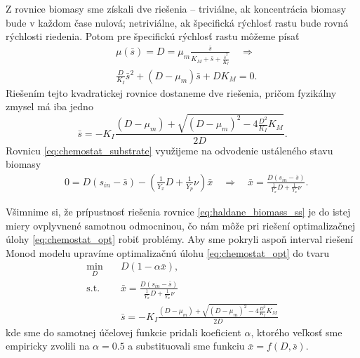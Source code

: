 Z rovnice biomasy sme získali dve riešenia -- triviálne, ak koncentrácia biomasy bude v každom čase nulová; netriviálne, ak špecifická rýchlosť rastu bude rovná rýchlosti riedenia. Potom pre špecifickú rýchlosť rastu môžeme písať 
\begin{align*}
	&\mu(\bar{s}) = D = \mu_{m}\frac{\bar{s}}{K_{M} + \bar{s} + \frac{\bar{s}^2}{K_{I}}} \quad \Longrightarrow \\
	&\frac{D}{K_{I}}\bar{s}^2 + (D-\mu_{m})\bar{s} + DK_{M} = 0.
\end{align*}
Riešením tejto kvadratickej rovnice dostaneme dve riešenia, pričom fyzikálny zmysel má iba jedno
\begin{equation}
	\bar{s} = -K_{I}\frac{\left(D-\mu_{m}\right) + \sqrt{\left(D-\mu_{m}\right)^2 - 4\frac{D^2}{K_{I}}K_{M}}}{2D}. \label{eq:haldane_subs_ss1}
\end{equation}
Rovnicu \eqref{eq:chemostat_substrate} využijeme na odvodenie ustáleného stavu biomasy
\begin{equation}
	\begin{split}
		&0 = D\left(s_{in}-\bar{s}\right) - \left(\frac{1}{Y_{x}}D + \frac{1}{Y_{p}}\nu\right)\bar{x} \quad \Longrightarrow \quad
		\bar{x} = \frac{D\left(s_{in}-\bar{s}\right)}{\frac{1}{Y_{x}}D + \frac{1}{Y_{x}}\nu}. \label{eq:haldane_biomass_ss1}
	\end{split}
\end{equation}

Všimnime si, že prípustnosť riešenia rovnice \eqref{eq:haldane_biomass_ss} je do istej miery ovplyvnené samotnou odmocninou, čo nám môže pri riešení optimalizačnej úlohy \eqref{eq:chemostat_opt} robiť problémy. Aby sme pokryli aspoň interval riešení Monod modelu upravíme optimalizačnú úlohu \eqref{eq:chemostat_opt} do tvaru
\begin{equation}
	\begin{split}
		\min_{D} &\quad D\left(1-\alpha\bar{x}\right), \\
		\text{s.t.} &\quad \bar{x} = \frac{D\left(s_{in}-\bar{s}\right)}{\frac{1}{Y_{x}}D + \frac{1}{Y_{x}}\nu} \\
		&\quad \bar{s} = -K_{I}\frac{\left(D-\mu_{m}\right) + \sqrt{\left(D-\mu_{m}\right)^2 - 4\frac{D^2}{K_{I}}K_{M}}}{2D}
	\end{split}
	\label{eq:chemostat_opt_w_ss1}
\end{equation}
kde sme do samotnej účelovej funkcie pridali koeficient $ \alpha $, ktorého veľkosť sme empiricky zvolili na $ \alpha = 0.5 $ a substituovali sme funkciu $ \bar{x} = f(D,\bar{s}) $. 

